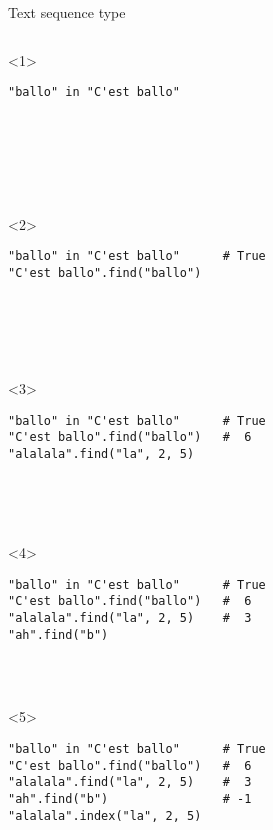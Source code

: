 \begin{frame}[fragile]{Text sequence type}

  \begin{columns}[onlytextwidth]
    \begin{column}{\textwidth}

      \begin{onlyenv}<1>
        \begin{lstlisting}[style=python]
"ballo" in "C'est ballo"







 \end{lstlisting}
      \end{onlyenv}

      \begin{onlyenv}<2>
        \begin{lstlisting}[style=python]
"ballo" in "C'est ballo"      # True
"C'est ballo".find("ballo")






 \end{lstlisting}
      \end{onlyenv}

      \begin{onlyenv}<3>
        \begin{lstlisting}[style=python]
"ballo" in "C'est ballo"      # True
"C'est ballo".find("ballo")   #  6
"alalala".find("la", 2, 5)





 \end{lstlisting}
      \end{onlyenv}

      \begin{onlyenv}<4>
        \begin{lstlisting}[style=python]
"ballo" in "C'est ballo"      # True
"C'est ballo".find("ballo")   #  6
"alalala".find("la", 2, 5)    #  3
"ah".find("b")




 \end{lstlisting}
      \end{onlyenv}

      \begin{onlyenv}<5>
        \begin{lstlisting}[style=python]
"ballo" in "C'est ballo"      # True
"C'est ballo".find("ballo")   #  6
"alalala".find("la", 2, 5)    #  3
"ah".find("b")                # -1
"alalala".index("la", 2, 5)




\end{lstlisting}
\end{onlyenv}
\end{column}
\end{columns}
\end{frame}
